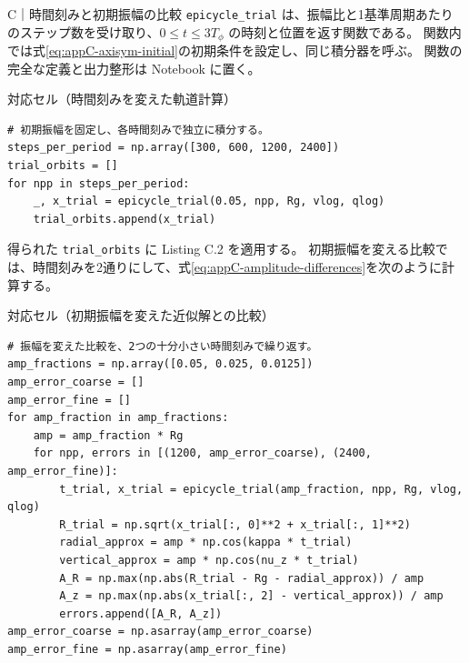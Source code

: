 \begin{notebookblock}{C｜時間刻みと初期振幅の比較}
\texttt{epicycle\_trial} は、振幅比と1基準周期あたりのステップ数を受け取り、$0\le t\le3T_\phi$ の時刻と位置を返す関数である。
関数内では式\eqref{eq:appC-axisym-initial}の初期条件を設定し、同じ積分器を呼ぶ。
関数の完全な定義と出力整形は Notebook に置く。
\par\smallskip\noindent\begin{minipage}{\linewidth}
{\sffamily\small\color{graytext}対応セル（時間刻みを変えた軌道計算）}
\begin{Verbatim}[fontsize=\footnotesize,xleftmargin=2mm,frame=single,framesep=1.8mm,framerule=0.35pt,rulecolor=\color{listingframe},fillcolor=\color{listingbg}]
# 初期振幅を固定し、各時間刻みで独立に積分する。
steps_per_period = np.array([300, 600, 1200, 2400])
trial_orbits = []
for npp in steps_per_period:
    _, x_trial = epicycle_trial(0.05, npp, Rg, vlog, qlog)
    trial_orbits.append(x_trial)
\end{Verbatim}
\end{minipage}

得られた \texttt{trial\_orbits} に Listing C.2 を適用する。
初期振幅を変える比較では、時間刻みを2通りにして、式\eqref{eq:appC-amplitude-differences}を次のように計算する。
\par\smallskip\noindent\begin{minipage}{\linewidth}
{\sffamily\small\color{graytext}対応セル（初期振幅を変えた近似解との比較）}
\begin{Verbatim}[fontsize=\footnotesize,xleftmargin=2mm,frame=single,framesep=1.8mm,framerule=0.35pt,rulecolor=\color{listingframe},fillcolor=\color{listingbg}]
# 振幅を変えた比較を、2つの十分小さい時間刻みで繰り返す。
amp_fractions = np.array([0.05, 0.025, 0.0125])
amp_error_coarse = []
amp_error_fine = []
for amp_fraction in amp_fractions:
    amp = amp_fraction * Rg
    for npp, errors in [(1200, amp_error_coarse), (2400, amp_error_fine)]:
        t_trial, x_trial = epicycle_trial(amp_fraction, npp, Rg, vlog, qlog)
        R_trial = np.sqrt(x_trial[:, 0]**2 + x_trial[:, 1]**2)
        radial_approx = amp * np.cos(kappa * t_trial)
        vertical_approx = amp * np.cos(nu_z * t_trial)
        A_R = np.max(np.abs(R_trial - Rg - radial_approx)) / amp
        A_z = np.max(np.abs(x_trial[:, 2] - vertical_approx)) / amp
        errors.append([A_R, A_z])
amp_error_coarse = np.asarray(amp_error_coarse)
amp_error_fine = np.asarray(amp_error_fine)
\end{Verbatim}
\end{minipage}

\end{notebookblock}

